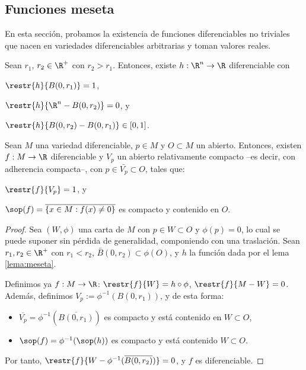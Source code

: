 \subsection{Funciones meseta}

En esta sección, probamos la existencia de funciones diferenciables no triviales
que nacen en variedades diferenciables arbitrarias y toman valores reales.

\begin{lema} \label{lema:meseta}
 Sean $r_{1}$, $r_{2}\in\R^{+}$ con $r_{2}> r_{1}$. Entonces, existe $h:
 \R^{n}\to\R$ diferenciable con
 \begin{nlist}
 \item
   $\restr{h}{B(0,r_{1})} = 1$,
 \item
   $\restr{h}{\R^{n}-B(0,r_{2})} = 0$, y
 \item
   $\restr{h}{B(0,r_{2})-B(0,r_{1})}\in[0,1]$.
 \end{nlist}
\end{lema}

\begin{nprop}
  Sean $M$ una variedad diferenciable, $p\in M$ y $O\subset M$ un
  abierto. Entonces, existen $f: M\to \R$ diferenciable y $V_{p}$ un abierto
  relativamente compacto --es decir, con adherencia compacta--, con
  $p\in\bar{V_{p}}\subset O$, tales que:
  \begin{nlist}
  \item
    $\restr{f}{V_{p}} = 1$, y
  \item
    $\sop(f) = \overline{\left\{ x\in M : f(x)\ne 0 \right\}}$ es
      compacto y contenido en $O$.
  \end{nlist}
\end{nprop}
\begin{proof}
  Sea $(W,\phi)$ una carta de $M$ con $p\in W\subset O$ y $\phi(p) = 0$, lo cual
  se puede suponer sin pérdida de generalidad, componiendo con una
  traslación. Sean $r_{1},r_{2}\in\R^{+}$ con $r_{1}<r_{2}$,
  $\bar{B}(0,r_{2})\subset\phi(O)$, y $h$ la función dada por el lema
  \ref{lema:meseta}.

  Definimos ya $f: M \to \R$: $\restr{f}{W} = h\circ \phi$, $\restr{f}{M-W} =
  0$. Además, definimos $V_{p} := \phi^{-1}(B(0,r_{1}))$, y de esta forma:
  \begin{itemize}
  \item $\overline{V_{p}} = \phi^{-1}(\overline{B(0,r_{1})})$ es compacto y está
    contenido en $W\subset O$,
  \item $\sop(f) = \phi^{-1}(\sop(h))$ es compacto y
    está contenido $W\subset O$.
  \end{itemize}

  Por tanto, $\restr{f}{W-\phi^{-1}(\overline{B(0,r_{2})})} = 0$, y $f$ es
  diferenciable.
\end{proof}

